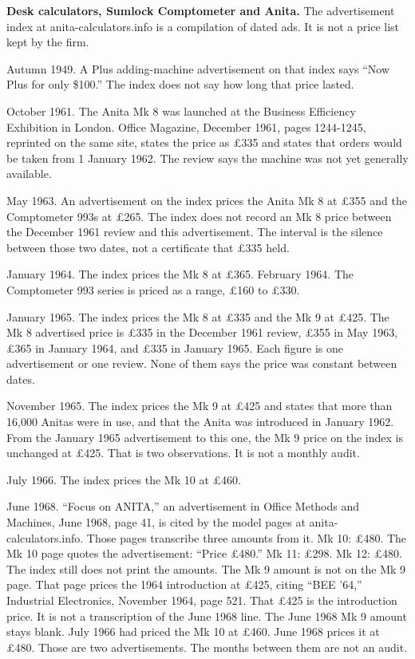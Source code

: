 \documentclass[
  10pt,
]{article}
\begin{document}
\textbf{Desk calculators, Sumlock Comptometer and Anita.} The
advertisement index at anita-calculators.info is a compilation of dated
ads. It is not a price list kept by the firm.

Autumn 1949. A Plus adding-machine advertisement on that index says
``Now Plus for only \$100.'' The index does not say how long that price
lasted.

October 1961. The Anita Mk 8 was launched at the Business Efficiency
Exhibition in London. Office Magazine, December 1961, pages 1244-1245,
reprinted on the same site, states the price as £335 and states that
orders would be taken from 1 January 1962. The review says the machine
was not yet generally available.

May 1963. An advertisement on the index prices the Anita Mk 8 at £355
and the Comptometer 993s at £265. The index does not record an Mk 8
price between the December 1961 review and this advertisement. The
interval is the silence between those two dates, not a certificate that
£335 held.

January 1964. The index prices the Mk 8 at £365. February 1964. The
Comptometer 993 series is priced as a range, £160 to £330.

January 1965. The index prices the Mk 8 at £335 and the Mk 9 at £425.
The Mk 8 advertised price is £335 in the December 1961 review, £355 in
May 1963, £365 in January 1964, and £335 in January 1965. Each figure is
one advertisement or one review. None of them says the price was
constant between dates.

November 1965. The index prices the Mk 9 at £425 and states that more
than 16,000 Anitas were in use, and that the Anita was introduced in
January 1962. From the January 1965 advertisement to this one, the Mk 9
price on the index is unchanged at £425. That is two observations. It is
not a monthly audit.

July 1966. The index prices the Mk 10 at £460.

June 1968. ``Focus on ANITA,'' an advertisement in Office Methods and
Machines, June 1968, page 41, is cited by the model pages at
anita-calculators.info. Those pages transcribe three amounts from it. Mk
10: £480. The Mk 10 page quotes the advertisement: ``Price £480.'' Mk
11: £298. Mk 12: £480. The index still does not print the amounts. The
Mk 9 amount is not on the Mk 9 page. That page prices the 1964
introduction at £425, citing ``BEE '64,'' Industrial Electronics,
November 1964, page 521. That £425 is the introduction price. It is not
a transcription of the June 1968 line. The June 1968 Mk 9 amount stays
blank. July 1966 had priced the Mk 10 at £460. June 1968 prices it at
£480. Those are two advertisements. The months between them are not an
audit.
\end{document}

